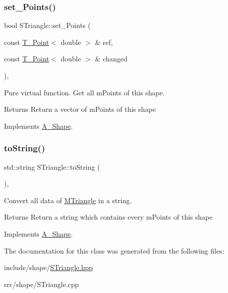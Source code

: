 \subsubsection{\texorpdfstring{set\+\_\+\+Points()}{set\_Points()}}
{\footnotesize\ttfamily bool S\+Triangle\+::set\+\_\+\+Points (\begin{DoxyParamCaption}\item[{const \hyperlink{classPoint}{T_Point}$<$ double $>$ \&}]{ref,  }\item[{const \hyperlink{classPoint}{T_Point}$<$ double $>$ \&}]{changed }\end{DoxyParamCaption})\hspace{0.3cm}{\ttfamily [override]}, {\ttfamily [virtual]}}



Pure virtual function. Get all mPoints of this shape.

\begin{DoxyReturn}{Returns}
Return a vector of mPoints of this shape
\end{DoxyReturn}


Implements \hyperlink{classShape_a6eb0d80cccc44cb72b06c61d9780bc6b}{A_Shape}.

\mbox{\label{classSTriangle_a32e4cee65f52d9ee4121c78dc97d86ab}} 
\subsubsection{\texorpdfstring{to\+String()}{aToString()}}
{\footnotesize\ttfamily std\+::string S\+Triangle\+::to\+String (\begin{DoxyParamCaption}{ }\end{DoxyParamCaption})\hspace{0.3cm}{\ttfamily [override]}, {\ttfamily [virtual]}}



Convert all data of \hyperlink{classMTriangle}{M\+Triangle} in a string. 

\begin{DoxyReturn}{Returns}
Return a string which contains every mPoints of this shape
\end{DoxyReturn}


Implements \hyperlink{classShape_a98fa87c6dc4c7045fd6897a8f3bc186c}{A_Shape}.



The documentation for this class was generated from the following files\+:\begin{DoxyCompactItemize}
\item 
include/shape/\hyperlink{STriangle_8hpp}{S\+Triangle.\+hpp}\item 
src/shape/S\+Triangle.\+cpp\end{DoxyCompactItemize}

